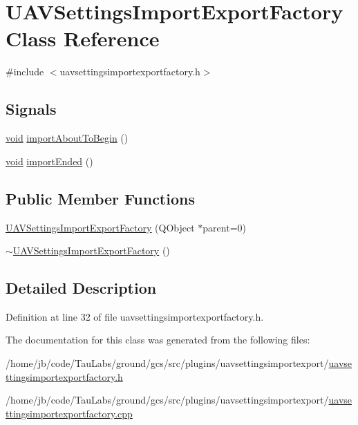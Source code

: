 \hypertarget{class_u_a_v_settings_import_export_factory}{\section{\-U\-A\-V\-Settings\-Import\-Export\-Factory \-Class \-Reference}
\label{class_u_a_v_settings_import_export_factory}
}


{\ttfamily \#include $<$uavsettingsimportexportfactory.\-h$>$}

\subsection*{\-Signals}
\begin{DoxyCompactItemize}
\item 
\hyperlink{group___u_a_v_objects_plugin_ga444cf2ff3f0ecbe028adce838d373f5c}{void} \hyperlink{group___u_a_v_settings_import_export_ga1d7a913adac9094e20d9086a8a1cb5c3}{import\-About\-To\-Begin} ()
\item 
\hyperlink{group___u_a_v_objects_plugin_ga444cf2ff3f0ecbe028adce838d373f5c}{void} \hyperlink{group___u_a_v_settings_import_export_ga456326e359badf7b245abf501d9a6006}{import\-Ended} ()
\end{DoxyCompactItemize}
\subsection*{\-Public \-Member \-Functions}
\begin{DoxyCompactItemize}
\item 
\hyperlink{group___u_a_v_settings_import_export_ga487d479be4ae96eddde7372c94c27bd7}{\-U\-A\-V\-Settings\-Import\-Export\-Factory} (\-Q\-Object $\ast$parent=0)
\item 
\hyperlink{group___u_a_v_settings_import_export_gac83bc105170e6ccdb6e39818edd45b57}{$\sim$\-U\-A\-V\-Settings\-Import\-Export\-Factory} ()
\end{DoxyCompactItemize}


\subsection{\-Detailed \-Description}


\-Definition at line 32 of file uavsettingsimportexportfactory.\-h.



\-The documentation for this class was generated from the following files\-:\begin{DoxyCompactItemize}
\item 
/home/jb/code/\-Tau\-Labs/ground/gcs/src/plugins/uavsettingsimportexport/\hyperlink{uavsettingsimportexportfactory_8h}{uavsettingsimportexportfactory.\-h}\item 
/home/jb/code/\-Tau\-Labs/ground/gcs/src/plugins/uavsettingsimportexport/\hyperlink{uavsettingsimportexportfactory_8cpp}{uavsettingsimportexportfactory.\-cpp}\end{DoxyCompactItemize}
